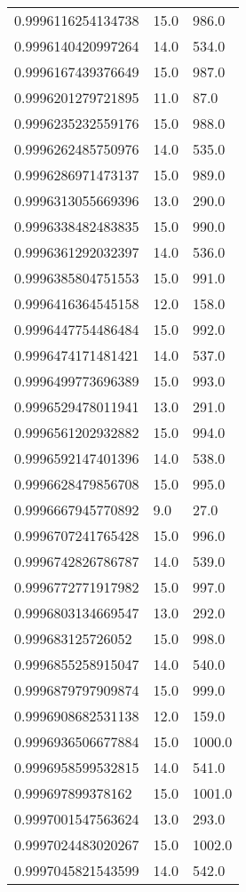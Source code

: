 \begin{center}
\begin{supertabular}[H]{p{0.30\textwidth}p{0.05\textwidth}p{0.05\textwidth}}
0.9996116254134738 & 15.0 & 986.0 \\ 
0.9996140420997264 & 14.0 & 534.0 \\ 
0.9996167439376649 & 15.0 & 987.0 \\ 
0.9996201279721895 & 11.0 & 87.0 \\ 
0.9996235232559176 & 15.0 & 988.0 \\ 
0.9996262485750976 & 14.0 & 535.0 \\ 
0.9996286971473137 & 15.0 & 989.0 \\ 
0.9996313055669396 & 13.0 & 290.0 \\ 
0.9996338482483835 & 15.0 & 990.0 \\ 
0.9996361292032397 & 14.0 & 536.0 \\ 
0.9996385804751553 & 15.0 & 991.0 \\ 
0.9996416364545158 & 12.0 & 158.0 \\ 
0.9996447754486484 & 15.0 & 992.0 \\ 
0.9996474171481421 & 14.0 & 537.0 \\ 
0.9996499773696389 & 15.0 & 993.0 \\ 
0.9996529478011941 & 13.0 & 291.0 \\ 
0.9996561202932882 & 15.0 & 994.0 \\ 
0.9996592147401396 & 14.0 & 538.0 \\ 
0.9996628479856708 & 15.0 & 995.0 \\ 
0.9996667945770892 & 9.0 & 27.0 \\ 
0.9996707241765428 & 15.0 & 996.0 \\ 
0.9996742826786787 & 14.0 & 539.0 \\ 
0.9996772771917982 & 15.0 & 997.0 \\ 
0.9996803134669547 & 13.0 & 292.0 \\ 
0.999683125726052 & 15.0 & 998.0 \\ 
0.9996855258915047 & 14.0 & 540.0 \\ 
0.9996879797909874 & 15.0 & 999.0 \\ 
0.9996908682531138 & 12.0 & 159.0 \\ 
0.9996936506677884 & 15.0 & 1000.0 \\ 
0.9996958599532815 & 14.0 & 541.0 \\ 
0.999697899378162 & 15.0 & 1001.0 \\ 
0.9997001547563624 & 13.0 & 293.0 \\ 
0.9997024483020267 & 15.0 & 1002.0 \\ 
0.9997045821543599 & 14.0 & 542.0 \\ 

\end{supertabular}
\end{center}
